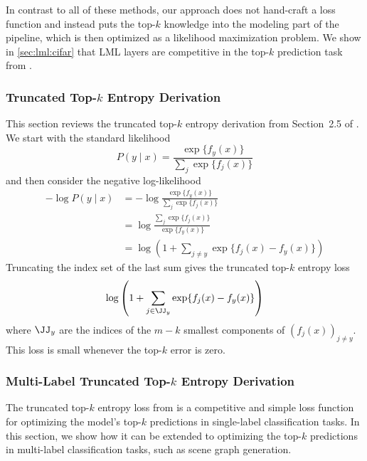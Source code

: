In contrast to all of these methods, our approach does
not hand-craft a loss function and instead puts
the top-$k$ knowledge into the modeling part of the
pipeline, which is then optimized as a likelihood
maximization problem.
We show in \cref{sec:lml:cifar} that LML layers are competitive
in the top-$k$ prediction task from \citet{berrada2018smooth}.

\subsubsection{Truncated Top-$k$ Entropy Derivation}
\label{sec:lml:entr-derivation}

This section reviews the truncated top-$k$ entropy derivation
from Section~2.5 of \citet{lapin2016loss}.
We start with the standard likelihood
\begin{equation}
  P(y\mid x)=\frac{\exp\{f_y(x)\}}{\sum_j \exp\{f_j(x)\}}
\end{equation}
and then consider the negative log-likelihood
\begin{equation}
  \begin{split}
    -\log P(y\mid x) &= -\log \frac{\exp\{f_y(x)\}}{\sum_j \exp\{f_j(x)\}} \\
    &= \log\frac{\sum_j \exp\{f_j(x)\}}{\exp\{f_y(x)\}} \\
    &= \log \left( 1 + \sum_{j\neq y} \exp\{f_j(x)-f_y(x)\} \right)
  \end{split}
\end{equation}
Truncating the index set of the last sum gives the truncated
top-$k$ entropy loss
\begin{equation}
  \log \left( 1 + \sum_{j\in \JJ_y} \exp\{f_j(x)-f_y(x)\} \right)
\end{equation}
where $\JJ_y$ are the indices of the $m-k$ smallest
components of $\left(f_j(x)\right)_{j\neq y}$.
This loss is small whenever the top-$k$ error is zero.

\subsubsection{Multi-Label Truncated Top-$k$ Entropy Derivation}
\label{sec:lml:entr-ml-derivation}

The truncated top-$k$ entropy loss from \citet{lapin2016loss}
is a competitive and simple loss function for optimizing
the model's top-$k$ predictions in single-label classification tasks.
In this section, we show how it can be extended to optimizing
the top-$k$ predictions in multi-label classification tasks,
such as scene graph generation.

